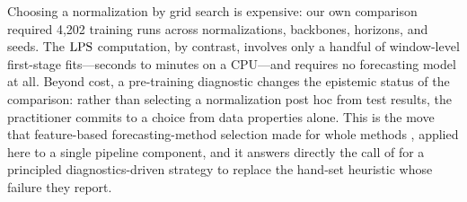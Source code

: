 Choosing a normalization by grid search is expensive: our own comparison required 4{,}202 training runs across normalizations, backbones, horizons, and seeds. The $\mathrm{LPS}$ computation, by contrast, involves only a handful of window-level first-stage fits---seconds to minutes on a CPU---and requires no forecasting model at all. Beyond cost, a pre-training diagnostic changes the epistemic status of the comparison: rather than selecting a normalization post hoc from test results, the practitioner commits to a choice from data properties alone. This is the move that feature-based forecasting-method selection made for whole methods \citep{talagala2023metalearning, monteromanso2020fforma}, applied here to a single pipeline component, and it answers directly the call of \citet{noise2025signal} for a principled diagnostics-driven strategy to replace the hand-set heuristic whose failure they report.
